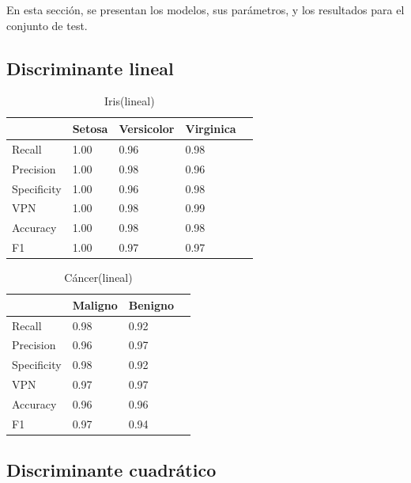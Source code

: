 \documentclass[a4paper,openwrite,12pt]{article}
\begin{document}
En esta sección, se presentan los modelos, sus parámetros, y los resultados para el conjunto de test.

\subsection{Discriminante lineal}
\begin{table}[H]
\centering
\begin{tabular}{@{}lllll@{}}
\toprule
            & Setosa & Versicolor & Virginica &  \\ \midrule
Recall      & 1.00   & 0.96       & 0.98      &  \\
Precision   & 1.00   & 0.98       & 0.96      &  \\
Specificity & 1.00   & 0.96       & 0.98      &  \\
VPN         & 1.00   & 0.98       & 0.99      &  \\
Accuracy    & 1.00   & 0.98       & 0.98      &  \\
F1          & 1.00   & 0.97       & 0.97      &  \\ \bottomrule
\end{tabular}
\caption{Iris(lineal)}
\end{table}


\begin{table}[H]
\centering
\begin{tabular}{@{}llll@{}}
\toprule
            & Maligno & Benigno &  \\ \midrule
Recall      & 0.98    & 0.92    &  \\
Precision   & 0.96    & 0.97    &  \\
Specificity & 0.98    & 0.92    &  \\
VPN         & 0.97    & 0.97    &  \\
Accuracy    & 0.96    & 0.96    &  \\
F1          & 0.97    & 0.94    &  \\ \bottomrule
\end{tabular}
\caption{Cáncer(lineal)}
\end{table}

\subsection{Discriminante cuadrático}
\end{document}
